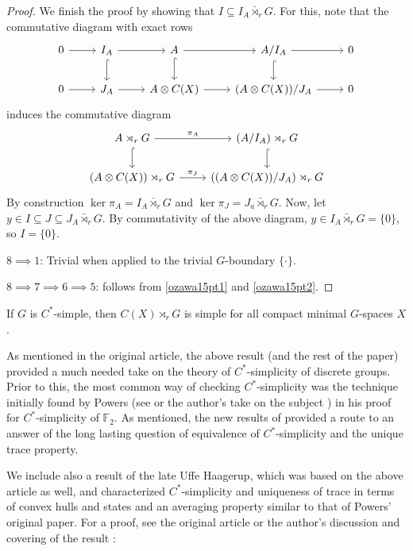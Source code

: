 \begin{proof}
	We finish the proof by showing that $I \subseteq I_A \bar \rtimes_r G$. For this, note that the commutative diagram with exact rows
	\begin{equation*}
		\begin{tikzcd}
			0 \ar[r] & I_A \ar[r] \ar[d, hook] & A \ar[r] \ar[d, hook] & A/I_A \ar[r] \ar[d, hook] & 0 \\
			0 \ar[r] & J_A \ar[r] & A \otimes C(X) \ar[r] & (A \otimes C(X))/J_A \ar[r] & 0
		\end{tikzcd}
	\end{equation*}
	induces the commutative diagram
	\begin{equation*}
		\begin{tikzcd}
			A \rtimes_r G \ar[r, "\pi_A"] \ar[d,hook]& (A/I_A) \rtimes_r G \ar[d, hook]\\
			(A \otimes C(X)) \rtimes_r G \ar[r, "\pi_J"] & ( (A \otimes C(X))/J_A) \rtimes_r G
		\end{tikzcd}
	\end{equation*}
	By construction $\ker \pi_A = I_A \bar \rtimes_r G$ and $\ker \pi_J = J_a \bar \rtimes_r G$. Now, let $y \in I \subseteq J \subseteq J_A \bar \rtimes_r G$. By commutativity of the above diagram, $y \in I_A \bar \rtimes_r G = \{0\}$, so $I = \{0\}$.

	$8 \implies 1$: Trivial when applied to the trivial $G$-boundary $\{\cdot\}$.

	$8 \implies 7 \implies 6 \implies 5$: follows from \cref{ozawa15pt1} and \cref{ozawa15pt2}.
\end{proof}
\begin{corollary}
	If $G$ is $C^*$-simple, then $C(X) \rtimes_{r}G$ is simple for all compact minimal $G$-spaces $X$.
\end{corollary}
\begin{note}
	As mentioned in the original article, the above result (and the rest of the paper) provided a much needed take on the theory of $C^*$-simplicity of discrete groups. Prior to this, the most common way of checking $C^*$-simplicity was the technique initially found by Powers (see \cite{powers1975simplicity} or the author's take on the subject \cite[chapter 3]{bscp}) in his proof for $C^*$-simplicity of $\mathbb{F}_2$. As mentioned, the new results of \cite{breuillard2017c} provided a route to an answer of the long lasting question of equivalence of $C^*$-simplicity and the unique trace property.
\end{note}
We include also a result of the late Uffe Haagerup, which was based on the above article as well, and characterized $C^*$-simplicity and uniqueness of trace in terms of convex hulls and states and an averaging property similar to that of Powers' original paper. For a proof, see the original article \cite{haagerup2015new} or the author's discussion and covering of the result \cite[Chapter 5]{bscp}:
